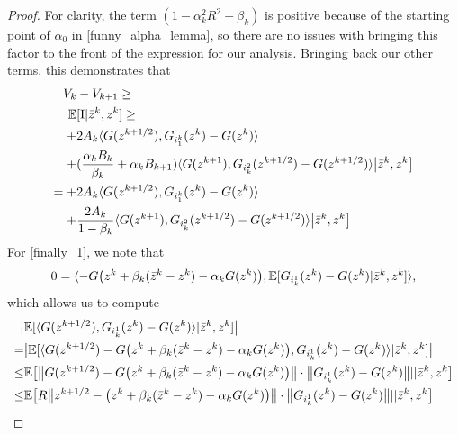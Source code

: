 \documentclass[11pt,reqno,oneside]{amsart}
\theoremstyle{definition}
\numberwithin{equation}{section}
\begin{document}
\begin{proof}
    For clarity, the term $(1 - \alpha_{k}^{2}R^{2} - \beta_{k})$ is positive because of the starting point of $\alpha_{0}$ in \cref{funny_alpha_lemma}, so there are no issues with bringing this factor to the front of the expression for our analysis.
    Bringing back our other terms, this demonstrates that
    \begin{align}
        V_{k}& - V_{k+1} \geq \notag \\
        \mathbb{E}&[\text{I}|\bar{z}^{k},z^{k}] \geq \notag \\
        +& 2A_{k} \langle G(z^{k+1/2}),G_{i_{1}^{k}}(z^{k}) - G(z^{k}) \rangle \label{finally_1} \\
        +&(\frac{\alpha_{k}B_{k}}{\beta_{k}} +\alpha_{k}B_{k+1}) \langle G(z^{k+1}),G_{i_{k}^{2}}(z^{k+1/2}) - G(z^{k+1/2}) \rangle \big{|} \bar{z}^{k}, z^{k} \big{]} \label{finally_2} \\
        =+& 2A_{k} \langle G(z^{k+1/2}),G_{i_{1}^{k}}(z^{k}) - G(z^{k}) \rangle \notag \\
        +&\frac{2A_{k}}{1 - \beta_{k}} \langle G(z^{k+1}),G_{i_{k}^{2}}(z^{k+1/2}) - G(z^{k+1/2}) \rangle \big{|} \bar{z}^{k}, z^{k} \big{]} \notag 
    \end{align}
    For \eqref{finally_1}, we note that
    \begin{equation}
        0 = \langle -G\big{(}z^{k} + \beta_{k}(\bar{z}^{k} - z^{k}) - \alpha_{k}G(z^{k})\big{)}, \mathbb{E}[G_{i_{k}^{1}}(z^{k}) - G(z^{k})|\bar{z}^{k},z^{k}]\rangle, \label{first_zero_thing}
    \end{equation}
    which allows us to compute
    \begin{align}
        \big{|}&\mathbb{E}[ \langle G(z^{k+1/2}), G_{i_{k}^{1}}(z^{k}) - G(z^{k})\rangle |\bar{z}^{k},z^{k}]\big{|} \notag \\
        =&\big{|}\mathbb{E}[ \langle G(z^{k+1/2}) - G\big{(}z^{k} + \beta_{k}(\bar{z}^{k} - z^{k}) - \alpha_{k}G(z^{k})\big{)}, G_{i_{k}^{1}}(z^{k}) - G(z^{k})\rangle |\bar{z}^{k},z^{k}]\big{|} \notag \\
        \leq&\mathbb{E}\big{[} \big{\|}G(z^{k+1/2}) - G\big{(}z^{k} + \beta_{k}(\bar{z}^{k} - z^{k}) - \alpha_{k}G(z^{k})\big{)}\big{\|} \cdot \big{\|}G_{i_{k}^{1}}(z^{k}) - G(z^{k})\big{\|} | |\bar{z}^{k},z^{k}\big{]} \notag \\
        \leq&\mathbb{E}\big{[} R\big{\|}z^{k+1/2} - \big{(}z^{k} + \beta_{k}(\bar{z}^{k} - z^{k}) - \alpha_{k}G(z^{k})\big{)}\big{\|} \cdot \big{\|}G_{i_{k}^{1}}(z^{k}) - G(z^{k})\big{\|} | |\bar{z}^{k},z^{k}\big{]} \notag \\

\end{align}
\end{proof}
\end{document}

